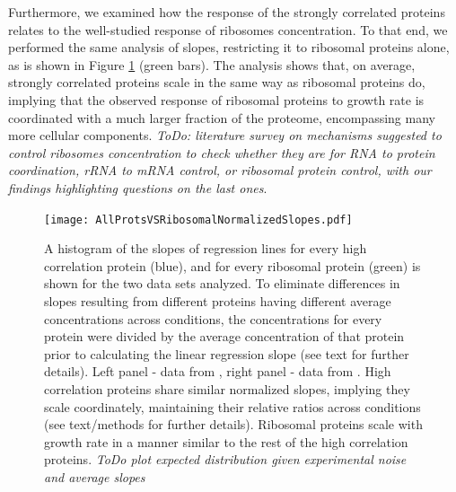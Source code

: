 \documentclass[notitlepage]{article}
\begin{document}
Furthermore, we examined how the response of the strongly correlated proteins relates to the well-studied response of ribosomes concentration.
To that end, we performed the same analysis of slopes, restricting it to ribosomal proteins alone, as is shown in Figure \ref{fig:globalfit} (green bars).
The analysis shows that, on average, strongly correlated proteins scale in the same way as ribosomal proteins do, implying that the observed response of ribosomal proteins to growth rate is coordinated with a much larger fraction of the proteome, encompassing many more cellular components.
\emph{ToDo: literature survey on mechanisms suggested to control ribosomes concentration to check whether they are for RNA to protein coordination, rRNA to mRNA control, or ribosomal protein control, with our findings highlighting questions on the last ones}.

\begin{figure}[h]
\centering
\texttt{[image: AllProtsVSRibosomalNormalizedSlopes.pdf]}
\caption{
    A histogram of the slopes of regression lines for every high correlation protein (blue), and for every ribosomal protein (green) is shown for the two data sets analyzed.
    To eliminate differences in slopes resulting from different proteins having different average concentrations across conditions, the concentrations for every protein were divided by the average concentration of that protein prior to calculating the linear regression slope (see text for further details).
    Left panel - data from \parencite{Valgepea2013}, right panel - data from \parencite{Heinemann2014}.
    High correlation proteins share similar normalized slopes, implying they scale coordinately, maintaining their relative ratios across conditions (see text/methods for further details).
    Ribosomal proteins scale with growth rate in a manner similar to the rest of the high correlation proteins.
    \emph{ToDo plot expected distribution given experimental noise and average slopes}
}
\label{fig:globalfit}
\end{figure}
\end{document}
